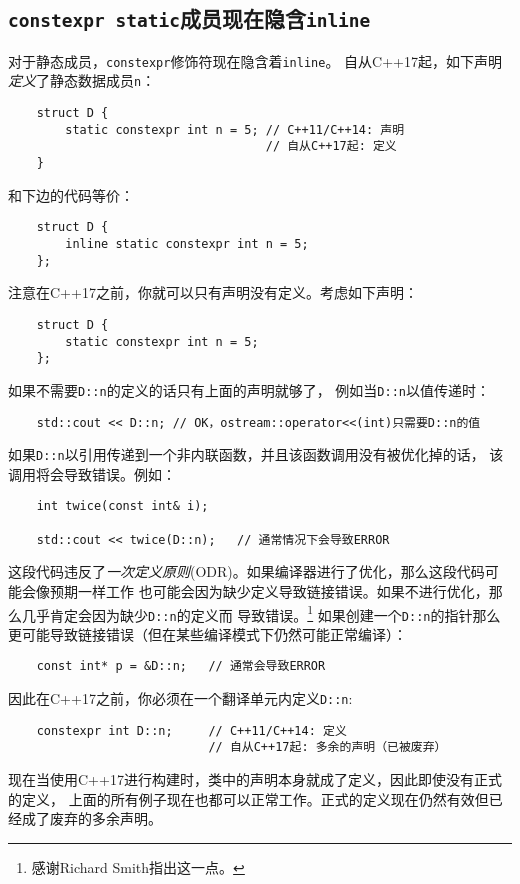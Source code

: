 \subsection{\texttt{constexpr static}成员现在隐含\texttt{inline}}
对于静态成员，\texttt{constexpr}修饰符现在隐含着\texttt{inline}。
自从C++17起，如下声明\emph{定义}了静态数据成员\texttt{n}：
\begin{lstlisting}
    struct D {
        static constexpr int n = 5; // C++11/C++14: 声明
                                    // 自从C++17起: 定义
    }
\end{lstlisting}
和下边的代码等价：
\begin{lstlisting}
    struct D {
        inline static constexpr int n = 5;
    };
\end{lstlisting}
注意在C++17之前，你就可以只有声明没有定义。考虑如下声明：
\begin{lstlisting}
    struct D {
        static constexpr int n = 5;
    };
\end{lstlisting}
如果不需要\texttt{D::n}的定义的话只有上面的声明就够了，
例如当\texttt{D::n}以值传递时：
\begin{lstlisting}
    std::cout << D::n; // OK，ostream::operator<<(int)只需要D::n的值
\end{lstlisting}
如果\texttt{D::n}以引用传递到一个非内联函数，并且该函数调用没有被优化掉的话，
该调用将会导致错误。例如：
\begin{lstlisting}
    int twice(const int& i);

    std::cout << twice(D::n);   // 通常情况下会导致ERROR
\end{lstlisting}
这段代码违反了\emph{一次定义原则}(ODR)。如果编译器进行了优化，那么这段代码可能会像预期一样工作
也可能会因为缺少定义导致链接错误。如果不进行优化，那么几乎肯定会因为缺少\texttt{D::n}的定义而
导致错误。\footnote{感谢Richard Smith指出这一点。}
如果创建一个\texttt{D::n}的指针那么更可能导致链接错误（但在某些编译模式下仍然可能正常编译）：
\begin{lstlisting}
    const int* p = &D::n;   // 通常会导致ERROR
\end{lstlisting}
因此在C++17之前，你必须在一个翻译单元内定义\texttt{D::n}:
\begin{lstlisting}
    constexpr int D::n;     // C++11/C++14: 定义
                            // 自从C++17起: 多余的声明（已被废弃）
\end{lstlisting}
现在当使用C++17进行构建时，类中的声明本身就成了定义，因此即使没有正式的定义，
上面的所有例子现在也都可以正常工作。正式的定义现在仍然有效但已经成了废弃的多余声明。

